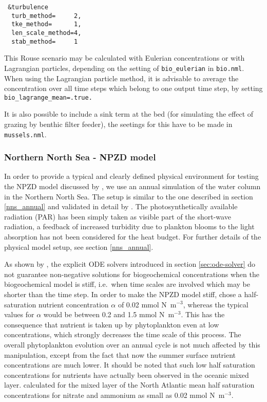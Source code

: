 \begin{verbatim}
 &turbulence
  turb_method=     2,
  tke_method=      1,
  len_scale_method=4,
  stab_method=     1
\end{verbatim}

This Rouse scenario may be calculated with Eulerian concentrations 
or with Lagrangian particles, depending on the setting
of {\tt bio\_eulerian} in {\tt bio.nml}.
When using the Lagrangian particle method, it is advisable
to average the concentration over all time steps 
which belong to one output time step, 
by setting {\tt bio\_lagrange\_mean=.true.}

It is also possible to include a sink term at the bed
(for simulating the effect of grazing by benthic filter feeder),
the seetings for this have to be made in {\tt mussels.nml}.


\subsubsection{Northern North Sea - NPZD model}\label{nns_annual_npzd}

In order to provide a typical and clearly defined physical environment
for testing the NPZD model discussed by \cite{Burchardetal2005b},
we use an annual simulation of the water column in the Northern North
Sea. The setup is similar to the one described in section
\ref{nns_annual} and validated
in detail by \cite{Boldingetal2002}.
The photosynthetically available radiation (PAR)
has been simply taken as visible part of the short-wave radiation,
a feedback of increased turbidity due to plankton blooms to the
light absorption has not been considered for the heat budget.
For further details of the physical model setup, see section \ref{nns_annual}.

As shown by \cite{Burchardetal2005b}, the explicit ODE solvers
introduced in section \ref{sec:ode-solver} do not guarantee
non-negative solutions for biogeochemical concentrations when the
biogeochemical model is stiff, i.e.\ when time scales are involved which may
be shorter than the time step. In order to make the NPZD model stiff,
\cite{Burchardetal2005b} chose a
half-saturation nutrient concentration $\alpha$ 
of 0.02  mmol N\, m$^{-3}$, whereas the typical values for $\alpha$ would be 
between 0.2 and 1.5 mmol N\, m$^{-3}$.
This has the consequence that nutrient is taken up by phytoplankton
even at low concentrations, which strongly decreases the
time scale of this process. The overall phytoplankton evolution over
an annual cycle 
is not much affected by this
manipulation, except from the fact that now the summer surface nutrient
concentrations are much lower.
It should be noted that such low half saturation concentrations
for nutrients have actually been observed in the oceanic mixed
layer. \cite{Harrisonetal1996} calculated for the mixed layer
of the North Atlantic mean half saturation concentrations
for nitrate and ammonium as small as 0.02  mmol N\, m$^{-3}$.

